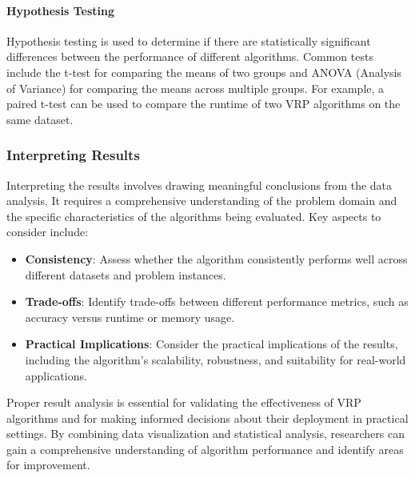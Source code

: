 \documentclass[
]{article}
\begin{document}
    \paragraph{Hypothesis Testing}

    Hypothesis testing is used to determine if there are statistically significant differences between the performance of different algorithms. Common tests include the t-test for comparing the means of two groups and ANOVA (Analysis of Variance) for comparing the means across multiple groups. For example, a paired t-test can be used to compare the runtime of two VRP algorithms on the same dataset.

    \subsubsection{Interpreting Results}

    Interpreting the results involves drawing meaningful conclusions from the data analysis. It requires a comprehensive understanding of the problem domain and the specific characteristics of the algorithms being evaluated. Key aspects to consider include:

    \begin{itemize}
        \item \textbf{Consistency}: Assess whether the algorithm consistently performs well across different datasets and problem instances.
        \item \textbf{Trade-offs}: Identify trade-offs between different performance metrics, such as accuracy versus runtime or memory usage.
        \item \textbf{Practical Implications}: Consider the practical implications of the results, including the algorithm's scalability, robustness, and suitability for real-world applications.
    \end{itemize}

    Proper result analysis is essential for validating the effectiveness of VRP algorithms and for making informed decisions about their deployment in practical settings. By combining data visualization and statistical analysis, researchers can gain a comprehensive understanding of algorithm performance and identify areas for improvement.
\end{document}
